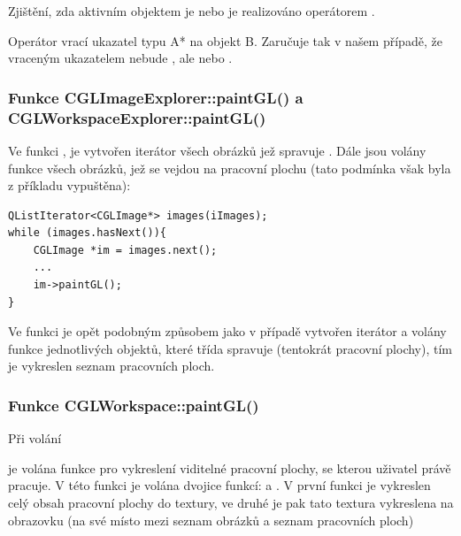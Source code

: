 Zjištění, zda aktivním objektem je  nebo  je realizováno operátorem .

Operátor  vrací ukazatel typu A* na objekt B. Zaručuje tak v našem případě, že vraceným ukazatelem nebude , ale  nebo .

\subsubsection*{Funkce CGLImageExplorer::paintGL() a CGLWorkspaceExplorer::paintGL()}
Ve funkci , je vytvořen iterátor všech obrázků jež spravuje . Dále jsou volány funkce  všech obrázků, jež se vejdou na pracovní plochu (tato podmínka však byla z příkladu vypuštěna):

\begin{lstlisting}[caption={Volání funkce \clist{paintGL()} studií, jež spravuje \clist{CGLImageExplorer}.}]
QListIterator<CGLImage*> images(iImages);
while (images.hasNext()){
	CGLImage *im = images.next();
	...
	im->paintGL();
}
\end{lstlisting}


Ve funkci  je opět podobným způsobem jako v případě  vytvořen iterátor a volány funkce  jednotlivých objektů, které třída spravuje (tentokrát pracovní plochy), tím je vykreslen seznam pracovních ploch.

\subsubsection*{Funkce  CGLWorkspace::paintGL()}
Při volání


\noindent je volána funkce pro vykreslení viditelné pracovní plochy, se kterou uživatel právě pracuje. V této funkci je volána dvojice funkcí:  a . V první funkci je vykreslen celý obsah pracovní plochy do textury, ve druhé je pak tato textura vykreslena na obrazovku (na své místo mezi seznam obrázků a seznam pracovních ploch)

